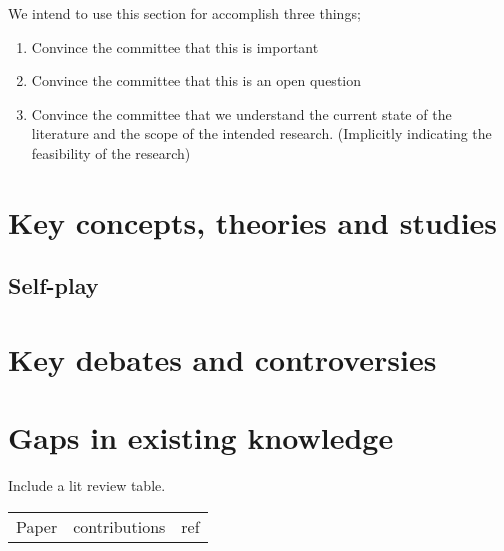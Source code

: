 

We intend to use this section for accomplish three things;
\begin{enumerate}
    \item Convince the committee that this is important
    \item Convince the committee that this is an open question
    \item Convince the committee that we understand the current state of the literature and the scope of the intended research. (Implicitly indicating the feasibility of the research)
\end{enumerate}

\section{Key concepts, theories and studies}%
\label{sec:concepts_theories_studies}





\subsection{Self-play}




\section{Key debates and controversies}%
\label{sec:debates_and_controversies}

\section{Gaps in existing knowledge}%
\label{sec:knowledge_gaps}


Include a lit review table.

\begin{tabular}{ccc}
    Paper & contributions & ref 
\end{tabular}


